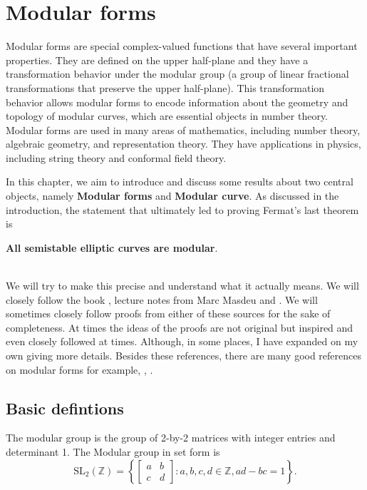 \section{Modular forms}

\label{Modular forms}
Modular forms are special complex-valued functions that have several important properties. They are defined on the upper half-plane and they have a transformation behavior under the modular group (a group of linear fractional transformations that preserve the upper half-plane). This transformation behavior allows modular forms to encode information about the geometry and topology of modular curves, which are essential objects in number theory. Modular forms are used in many areas of mathematics, including number theory, algebraic geometry, and representation theory. They have applications in physics, including string theory and conformal field theory.

In this chapter, we aim to introduce and discuss some results about two central objects, namely \textbf{Modular forms} and \textbf{Modular curve}. As discussed in the introduction, the statement that ultimately led to proving Fermat's last theorem is 
\begin{center}
    \textbf{All semistable elliptic curves are modular}.
\end{center}\\

We will try to make this precise and understand what it actually means.  We will closely follow the book \cite{diamond2005first}, lecture notes from Marc Masdeu \cite{Masdeu2015ModularForms} and \cite{visser_computing_2023}. We will sometimes closely follow proofs from either of these sources for the sake of completeness. At times the ideas of the proofs are not original but inspired and even closely followed at times.  Although, in some places, I have expanded on my own giving more details. Besides these references, there are many good references on modular forms for example, 
\cite{Lang1995},\cite{miyake2006modular} . 

\subsection{Basic defintions}


\begin{defi}

The modular group is the group of 2-by-2 matrices with integer entries and determinant 1. The Modular group in set form is 
$$
\mathrm{SL}_{2}(\mathbb{Z})=\left\{\left[\begin{array}{ll}
a & b \\
c & d
\end{array}\right]: a, b, c, d \in \mathbb{Z}, a d-b c=1\right\} .
$$
\end{defi}

